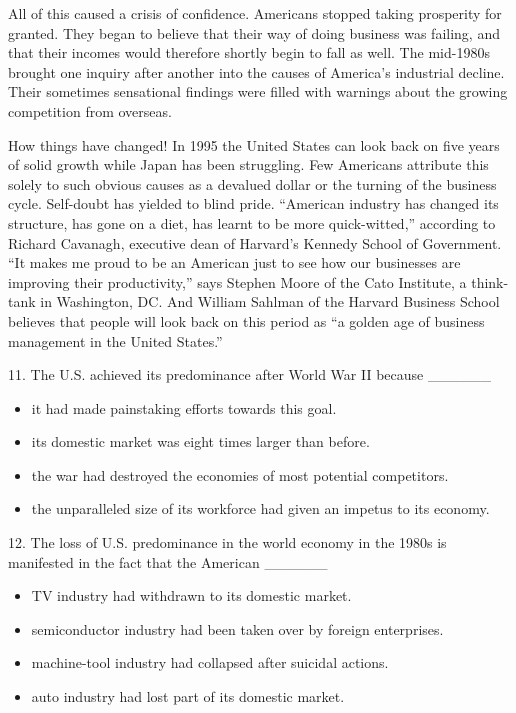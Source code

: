 \documentclass[UTF8,11pt]{ctexart}
\begin{document}
All of this caused a crisis of confidence. Americans stopped taking prosperity for granted. They began to believe that their way of doing business was failing, and that their incomes would therefore shortly begin to fall as well. The mid-1980s brought one inquiry after another into the causes of America’s industrial decline. Their sometimes sensational findings were filled with warnings about the growing competition from overseas.


How things have changed! In 1995 the United States can look back on five years of solid growth while Japan has been struggling. Few Americans attribute this solely to such obvious causes as a devalued dollar or the turning of the business cycle. Self-doubt has yielded to blind pride. “American industry has changed its structure, has gone on a diet, has learnt to be more quick-witted,” according to Richard Cavanagh, executive dean of Harvard’s Kennedy School of Government. “It makes me proud to be an American just to see how our businesses are improving their productivity,” says Stephen Moore of the Cato Institute, a think-tank in Washington, DC. And William Sahlman of the Harvard Business School believes that people will look back on this period as “a golden age of business management in the United States.”


11. The U.S. achieved its predominance after World War II because \_\_\_\_\_\_


\begin{itemize}[leftmargin=2em,itemsep=.2em,topsep=.4em]\item[A.] it had made painstaking efforts towards this goal.
\item[B.] its domestic market was eight times larger than before.
\item[C.] the war had destroyed the economies of most potential competitors.
\item[D.] the unparalleled size of its workforce had given an impetus to its economy.
\end{itemize}

12. The loss of U.S. predominance in the world economy in the 1980s is manifested in the fact that the American \_\_\_\_\_\_


\begin{itemize}[leftmargin=2em,itemsep=.2em,topsep=.4em]\item[A.] TV industry had withdrawn to its domestic market.
\item[B.] semiconductor industry had been taken over by foreign enterprises.
\item[C.] machine-tool industry had collapsed after suicidal actions.
\item[D.] auto industry had lost part of its domestic market.
\end{itemize}
\end{document}
